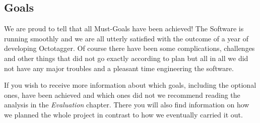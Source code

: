 \subsection{Goals}
We are proud to tell that all Must-Goals have been achieved! The Software is running smoothly and we are all utterly satisfied with the outcome of a year of developing Octotagger. Of course there have been some complications, challenges and other things that did not go exactly according to plan but all in all we did not have any major troubles and a pleasant time engineering the software.

If you wish to receive more information about which goals, including the optional ones, have been achieved and which ones did not we recommend reading the analysis in the \textit{Evaluation} chapter. There you will also find information on how we planned the whole project in contrast to how we eventually carried it out.






















